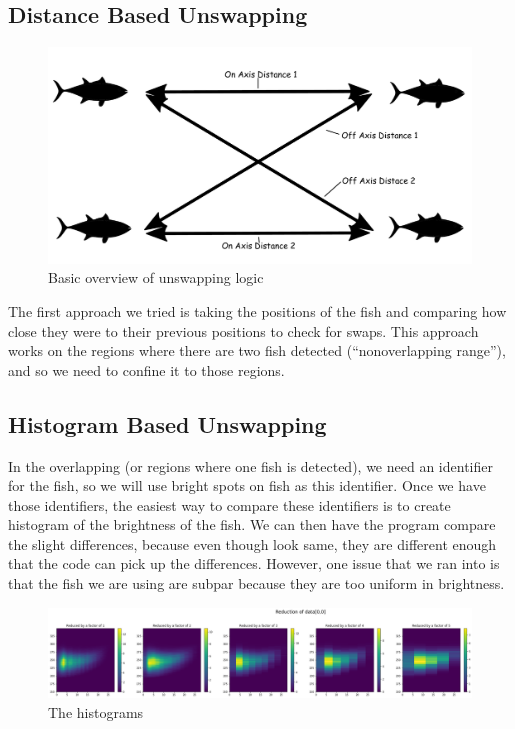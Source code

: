 \documentclass{article}
\begin{document}
\subsection{Distance Based Unswapping}
\begin{figure}[H]
	\centering
	\includegraphics[width=.75\linewidth]{fish2}
	\caption{Basic overview of unswapping logic}
\end{figure}
The first approach we tried is taking the positions of the fish and comparing how close they were to their previous positions to check for swaps. This approach works on the regions where there are two fish detected (``nonoverlapping range''), and so we need to confine it to those regions. 

\subsection{Histogram Based Unswapping}
In the overlapping (or regions where one fish is detected), we need an identifier for the fish, so we will use bright spots on fish as this identifier. Once we have those identifiers, the easiest way to compare these identifiers is to create histogram of the brightness of the fish. We can then have the program compare the slight differences, because even though look same, they are different enough that the code can pick up the differences. However, one issue that we ran into is that the fish we are using are subpar because they are too uniform in brightness.

\begin{figure}[H]
	\centering
	\includegraphics[width=\linewidth]{reducedHist}
	\caption{The histograms}
	\label{fig:reducedHist}
\end{figure}
\end{document}
